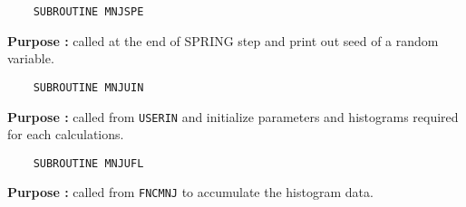 

\newlength{\MNJSPE}
\settowidth{\MNJSPE}{\tt     SUBROUTINE MNJSPE}
\begin{verbatim}
    SUBROUTINE MNJSPE
\end{verbatim}
\vspace{-28pt}
\hspace*{4ex}\fbox{\rule[14pt]{\MNJSPE}{0cm}}
\begin{list}{ }{\parsep=0pt \itemsep=0pt \topsep=0pt }
\item[\bf Purpose :] called at the end of SPRING step and print out
seed of a random variable.
\end{list}



\newlength{\MNJUIN}
\settowidth{\MNJUIN}{\tt     SUBROUTINE MNJUIN}
\begin{verbatim}
    SUBROUTINE MNJUIN
\end{verbatim}
\vspace{-28pt}
\hspace*{4ex}\fbox{\rule[14pt]{\MNJUIN}{0cm}}
\begin{list}{ }{\parsep=0pt \itemsep=0pt \topsep=0pt }
\item[\bf Purpose :] 
called from {\tt USERIN} and initialize
parameters and histograms required for each calculations.
\end{list}


\newlength{\MNJUFL}
\settowidth{\MNJUFL}{\tt         SUBROUTINE MNJUFL}
\begin{verbatim}
    SUBROUTINE MNJUFL
\end{verbatim}
\vspace{-28pt}
\hspace*{4ex}\fbox{\rule[14pt]{\MNJUFL}{0cm}}
\begin{list}{ }{\parsep=0pt \itemsep=0pt \topsep=0pt }
\item[\bf Purpose :] 
called from {\tt FNCMNJ} to accumulate the histogram data.
\end{list}



